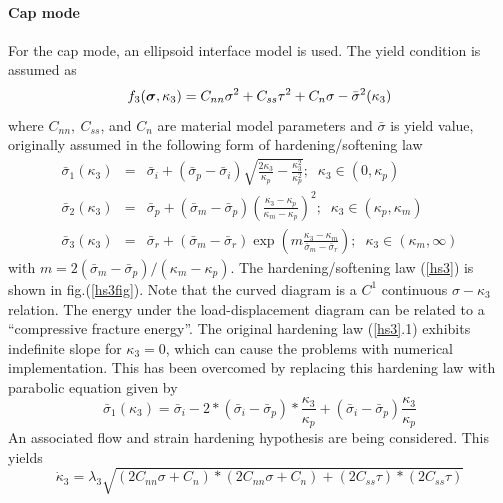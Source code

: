 \documentclass[epsf,a4paper]{article}
\newcommand{\mbf}[1]{\mbox{\boldmath$#1$}}
\newcommand{\del}[2]{\mbox{$\displaystyle\frac{#1}{#2}$}}
\newcommand{\sig}{\mbf{\sigma}}
\begin{document}
\paragraph{Cap mode}
For the cap mode, an ellipsoid interface model is used. The yield condition is assumed as
\begin{equation}
  f_3(\sig, \kappa_3) = C_{nn}\sigma^2+C_{ss}\tau^2 + C_n\sigma-\bar\sigma^2(\kappa_3)
\end{equation}
where $C_{nn},\ C_{ss}$, and $C_n$ are material model parameters and $\bar\sigma$ is yield value, originally assumed in the following form of hardening/softening law \cite{Rots}
\begin{eqnarray}
  \nonumber
  \bar\sigma_1(\kappa_3)&=&\bar\sigma_i+(\bar\sigma_p-\bar\sigma_i)\sqrt{\del{2\kappa_3}{\kappa_p}-\del{\kappa_3^2}{\kappa_p^2}};\;\;\kappa_3\in(0,\kappa_p)\\
  \label{hs3}
  \bar\sigma_2(\kappa_3)&=&\bar\sigma_p+(\bar\sigma_m-\bar\sigma_p)\left(\del{\kappa_3-\kappa_p}{\kappa_m-\kappa_p}\right)^2;\;\;\kappa_3\in(\kappa_p, \kappa_m)\\
  \nonumber
  \bar\sigma_3(\kappa_3)&=&\bar\sigma_r+(\bar\sigma_m-\bar\sigma_r)\exp\left(m\del{\kappa_3-\kappa_m}{\bar\sigma_m-\bar\sigma_r}\right);\;\;\kappa_3\in(\kappa_m, \infty)
\end{eqnarray}
with $m=2(\bar\sigma_m-\bar\sigma_p)/(\kappa_m-\kappa_p)$. The hardening/softening law (\ref{hs3}) is shown in fig.(\ref{hs3fig}). Note that the curved diagram is a $C^1$ continuous $\sigma-\kappa_3$ relation. The energy under the load-displacement diagram can be related to a ``compressive fracture energy''.
The original hardening law (\ref{hs3}.1) exhibits indefinite slope for $\kappa_3=0$, which can cause the problems with numerical implementation. This has been overcomed by replacing this hardening law with parabolic equation given by
\begin{equation}
  \bar\sigma_1(\kappa_3) = \bar\sigma_i-2*(\bar\sigma_i-\bar\sigma_p)*\del{\kappa_3}{\kappa_p}+(\bar\sigma_i-\bar\sigma_p)\del{\kappa_3}{\kappa_p}
\end{equation}
An associated flow and strain hardening hypothesis are being considered. This yields
\begin{equation}
  \dot\kappa_3=\lambda_3\sqrt{(2C_{nn}\sigma+C_n)*(2C_{nn}\sigma+C_n) + (2C_{ss}\tau)*(2C_{ss}\tau)}
\end{equation}
\end{document}
